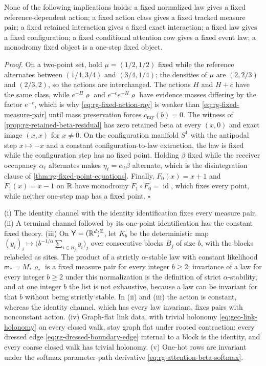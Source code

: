 None of the following implications holds: a fixed normalized law gives a fixed
reference-dependent action; a fixed action class gives a fixed tracked measure
pair; a fixed retained interaction gives a fixed exact interaction; a fixed law
gives a fixed configuration; a fixed conditional attention row gives a fixed
event law; a monodromy fixed object is a one-step fixed object.

\noindent\emph{Proof.}
On a two-point set, hold \(\mu=(1/2,1/2)\) fixed while the reference alternates
between \((1/4,3/4)\) and \((3/4,1/4)\); the densities of \(\mu\) are
\((2,2/3)\) and \((2/3,2)\), so the actions are interchanged. The actions \(H\)
and \(H+c\) have the same class, while \(e^{-H}\varrho\) and \(e^{-c}e^{-H}\varrho\)
have evidence masses differing by the factor \(e^{-c}\), which is why
\eqref{eq:rg-fixed-action-ray} is weaker than \eqref{eq:rg-fixed-measure-pair}
until mass preservation forces \(c_{\mathrm{ray}}(b)=0\). The witness of
\cref{prop:rg-retained-beta-residual} has zero retained beta at every \((x,0)\)
and exact image \((x,x)\) for \(x\neq0\). On the configuration manifold
\(S^1\) with the antipodal step \(x\mapsto-x\) and a constant
configuration-to-law extraction, the law is fixed while the configuration step
has no fixed point. Holding \(\beta\) fixed while the receiver occupancy
\(\alpha_\ell\) alternates makes \(\eta_\ell=\alpha_\ell\beta\) alternate, which
is the disintegration clause of \cref{thm:rg-fixed-point-equations}. Finally,
\(F_0(x)=x+1\) and \(F_1(x)=x-1\) on \(\mathbb R\) have monodromy
\(F_1\circ F_0=\operatorname{id}\), which fixes every point, while neither
one-step map has a fixed point. \(\square\)

(i) The identity channel with the identity identification fixes every measure
pair. (ii) A terminal channel followed by its one-point identification has the
constant fixed theory. (iii) On \(\mathsf Y=(\mathbb R^d)^{\mathbb Z}\), let \(K_b\) be
the deterministic map
\((y_i)_i\mapsto\bigl(b^{-1/\alpha}\sum_{i\in B_j}y_i\bigr)_j\) over consecutive
blocks \(B_j\) of size \(b\), with the blocks relabeled as sites. The product of
a strictly \(\alpha\)-stable law with constant likelihood \(\mathsf m_*=M_*\varrho_*\) is a
fixed measure pair for every integer \(b\geq2\); invariance of a law for every
integer \(b\geq2\) under this normalization is the definition of strict
\(\alpha\)-stability, and at one integer \(b\) the list is not exhaustive,
because a law can be invariant for that \(b\) without being strictly stable. In
(ii) and (iii) the action is constant, whereas the identity channel, which has
every law invariant, fixes pairs with nonconstant action. (iv) Graph-flat link
data, with trivial holonomy \eqref{eq:geo-link-holonomy} on every closed walk,
stay graph flat under rooted contraction: every dressed edge
\eqref{eq:rg-dressed-boundary-edge} internal to a block is the identity, and
every coarse closed walk has trivial holonomy. (v) One-hot rows are invariant
under the softmax parameter-path derivative \eqref{eq:rg-attention-beta-softmax}.

